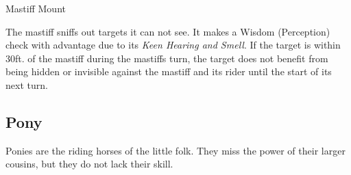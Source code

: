 \documentclass[letterpaper,twocolumn,openany,nodeprecatedcode]{dndbook}
\begin{document}
\begin{DndMonster}[float*=b,width=\textwidth + 8pt]{Mastiff Mount}
\begin{multicols}{2}
    The mastiff sniffs out targets it can not see. It makes a Wisdom (Perception) check with advantage due to its \textit{Keen Hearing and Smell}. If the target is within 30ft. of the mastiff during the mastiffs turn, the target does not benefit from being hidden or invisible against the mastiff and its rider until the start of its next turn.

  \end{multicols}
\end{DndMonster}

\subsection{Pony}
Ponies are the riding horses of the little folk.
They miss the power of their larger cousins, but they do not lack their skill.
\end{document}
